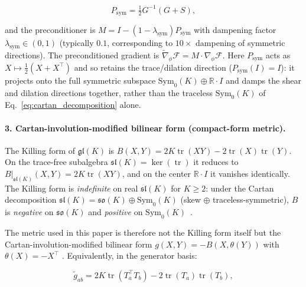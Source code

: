 \documentclass[twoside,11pt]{article}
\begin{document}
\begin{equation}
P_{\mathrm{sym}} = \tfrac{1}{2}G^{-1}(G + S),
\end{equation}

and the preconditioner is $M = I - (1 - \lambda_{\mathrm{sym}}) P_{\mathrm{sym}}$ with dampening factor $\lambda_{\mathrm{sym}} \in (0, 1)$ (typically $0.1$, corresponding to $10\times$ dampening of symmetric directions). The preconditioned gradient is $\tilde{\nabla}_\phi \mathcal{F} = M \cdot \nabla_\phi \mathcal{F}$. Here $P_{\mathrm{sym}}$ acts as $X \mapsto \tfrac{1}{2}(X + X^\top)$ and so retains the trace/dilation direction ($P_{\mathrm{sym}}(I) = I$): it projects onto the full symmetric subspace $\mathrm{Sym}_0(K) \oplus \mathbb{R}\cdot I$ and damps the shear and dilation directions together, rather than the traceless $\mathrm{Sym}_0(K)$ of Eq.~\eqref{eq:cartan_decomposition} alone.

\paragraph{3. Cartan-involution-modified bilinear form (compact-form metric).}
The Killing form of $\mathfrak{gl}(K)$ is $B(X, Y) = 2K \operatorname{tr}(XY) - 2\operatorname{tr}(X)\operatorname{tr}(Y)$. On the trace-free subalgebra $\mathfrak{sl}(K) = \ker(\operatorname{tr})$ it reduces to $B|_{\mathfrak{sl}(K)}(X,Y) = 2K\operatorname{tr}(XY)$, and on the center $\mathbb{R}\cdot I$ it vanishes identically. The Killing form is \emph{indefinite} on real $\mathfrak{sl}(K)$ for $K\geq 2$: under the Cartan decomposition $\mathfrak{sl}(K) = \mathfrak{so}(K) \oplus \mathrm{Sym}_0(K)$ (skew $\oplus$ traceless-symmetric), $B$ is \emph{negative} on $\mathfrak{so}(K)$ and \emph{positive} on $\mathrm{Sym}_0(K)$~\citep{Hall2015,Gallier2020}.

The metric used in this paper is therefore not the Killing form itself but the Cartan-involution-modified bilinear form $g(X, Y) = -B(X, \theta(Y))$ with $\theta(X) = -X^\top$ \citep[Ch.~VI]{Knapp2002}. Equivalently, in the generator basis:

\begin{equation}
\tilde{g}_{ab} = 2K \operatorname{tr}(T_a^\top T_b) - 2\operatorname{tr}(T_a)\operatorname{tr}(T_b),
\label{eq:killing_metric}
\end{equation}
\end{document}
